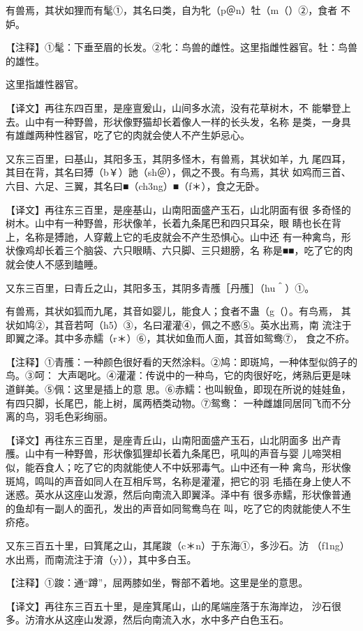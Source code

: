 \documentclass[a4paper,12pt,UTF8,twoside]{ctexbook}
\begin{document}
有兽焉，其状如狸而有髦①，其名曰类，自为牝（p＠n）牡（m（）②，食者 不妒。

【注释】①髦：下垂至眉的长发。②牝：鸟兽的雌性。这里指雌性器官。牡：鸟兽的雄性。

这里指雄性器官。

【译文】再往东四百里，是座亶爰山，山间多水流，没有花草树木，不 能攀登上去。山中有一种野兽，形状像野猫却长着像人一样的长头发，名称 是类，一身具有雄雌两种性器官，吃了它的肉就会使人不产生妒忌心。

又东三百里，曰基山，其阳多玉，其阴多怪木，有兽焉，其状如羊，九 尾四耳，其目在背，其名曰猼（b￥）訑（sh＠），佩之不畏。有鸟焉，其状 如鸡而三首、六目、六足、三翼，其名曰■（ch3ng）■（f＊），食之无卧。

【译文】再往东三百里，是座基山，山南阳面盛产玉石，山北阴面有很 多奇怪的树木。山中有一种野兽，形状像羊，长着九条尾巴和四只耳朵，眼 睛也长在背上，名称是猼訑，人穿戴上它的毛皮就会不产生恐惧心。山中还 有一种禽鸟，形状像鸡却长着三个脑袋、六只眼睛、六只脚、三只翅膀，名 称是■■，吃了它的肉就会使人不感到瞌睡。

又东三百里，曰青丘之山，其阳多玉，其阴多青雘［丹雘］（hu＾）①。

有兽焉，其状如狐而九尾，其音如婴儿，能食人；食者不蛊（g（）。有鸟焉， 其状如鸠②，其音若呵（h5）③，名曰灌灌④，佩之不惑⑤。英水出焉，南 流注于即翼之泽。其中多赤鱬（r＊）⑥，其状如鱼而人面，其音如鸳鸯⑦， 食之不疥。

【注释】①青雘：一种颜色很好看的天然涂料。②鸠：即斑鸠，一种体型似鸽子的鸟。③呵： 大声喝叱。④灌灌：传说中的一种鸟，它的肉很好吃，烤熟后更是味道鲜美。⑤佩：这里是插上的意 思。⑥赤鱬：也叫鲵鱼，即现在所说的娃娃鱼，有四只脚，长尾巴，能上树，属两栖类动物。⑦鸳鸯： 一种雌雄同居同飞而不分离的鸟，羽毛色彩绚丽。

【译文】再往东三百里，是座青丘山，山南阳面盛产玉石，山北阴面多 出产青雘。山中有一种野兽，形状像狐狸却长着九条尾巴，吼叫的声音与婴 儿啼哭相似，能吞食人；吃了它的肉就能使人不中妖邪毒气。山中还有一种 禽鸟，形状像斑鸠，鸣叫的声音如同人在互相斥骂，名称是灌灌，把它的羽 毛插在身上使人不迷惑。英水从这座山发源，然后向南流入即翼泽。泽中有 很多赤鱬，形状像普通的鱼却有一副人的面孔，发出的声音如同鸳鸯鸟在 叫，吃了它的肉就能使人不生疥疮。

又东三百五十里，曰箕尾之山，其尾踆（c＊n）于东海①，多沙石。汸 （f1ng）水出焉，而南流注于淯（y）），其中多白玉。

【注释】①踆：通“蹲”，屈两膝如坐，臀部不着地。这里是坐的意思。

【译文】再往东三百五十里，是座箕尾山，山的尾端座落于东海岸边， 沙石很多。汸淯水从这座山发源，然后向南流入水，水中多产白色玉石。
\end{document}
